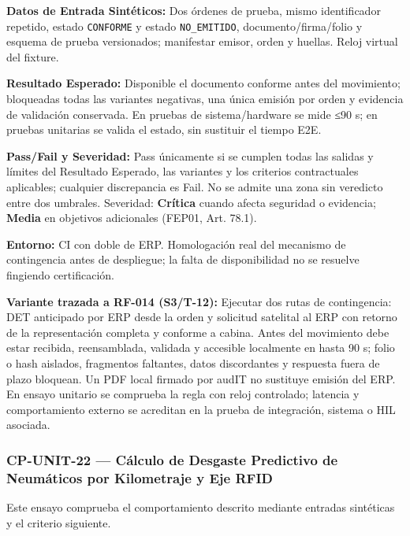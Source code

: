 \par\noindent\textbf{Datos de Entrada Sintéticos:} Dos órdenes de prueba, mismo identificador repetido, estado \texttt{C\allowbreak{}O\allowbreak{}N\allowbreak{}F\allowbreak{}O\allowbreak{}R\allowbreak{}M\allowbreak{}E\allowbreak{}} y estado \texttt{N\allowbreak{}O\allowbreak{}\_\allowbreak{}E\allowbreak{}M\allowbreak{}I\allowbreak{}T\allowbreak{}I\allowbreak{}D\allowbreak{}O\allowbreak{}}, documento/firma/folio y esquema de prueba versionados; manifestar emisor, orden y huellas. Reloj virtual del fixture.\par
\par\noindent\textbf{Resultado Esperado:} Disponible el documento conforme antes del movimiento; bloqueadas todas las variantes negativas, una única emisión por orden y evidencia de validación conservada. En pruebas de sistema/hardware se mide ≤90 s; en pruebas unitarias se valida el estado, sin sustituir el tiempo E2E.\par
\par\noindent\textbf{Pass/Fail y Severidad:} Pass únicamente si se cumplen todas las salidas y límites del Resultado Esperado, las variantes y los criterios contractuales aplicables; cualquier discrepancia es Fail. No se admite una zona sin veredicto entre dos umbrales. Severidad: \textbf{Crítica} cuando afecta seguridad o evidencia; \textbf{Media} en objetivos adicionales (FEP01, Art. 78.1).\par
\par\noindent\textbf{Entorno:} CI con doble de ERP. Homologación real del mecanismo de contingencia antes de despliegue; la falta de disponibilidad no se resuelve fingiendo certificación.\par


\par\noindent\textbf{Variante trazada a RF-014 (S3/T-12):} Ejecutar dos rutas de contingencia: DET anticipado por ERP desde la orden y solicitud satelital al ERP con retorno de la representación completa y conforme a cabina. Antes del movimiento debe estar recibida, reensamblada, validada y accesible localmente en hasta 90 s; folio o hash aislados, fragmentos faltantes, datos discordantes y respuesta fuera de plazo bloquean. Un PDF local firmado por audIT no sustituye emisión del ERP. En ensayo unitario se comprueba la regla con reloj controlado; latencia y comportamiento externo se acreditan en la prueba de integración, sistema o HIL asociada.\par
\subsubsection*{CP-UNIT-22 — Cálculo de Desgaste Predictivo de Neumáticos por Kilometraje y Eje RFID}\label{sec:9-cp-unit-22}
Este ensayo comprueba el comportamiento descrito mediante entradas sintéticas y el criterio siguiente.


